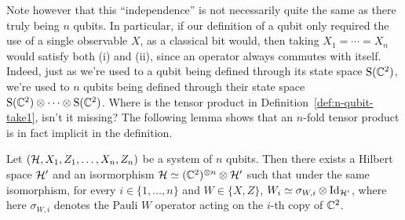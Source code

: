 Note however that this ``independence'' is not necessarily quite the same as there truly being $n$ qubits. In particular, if our definition of a qubit only required the use of a single observable $X$, as a classical bit would, then taking $X_1=\cdots=X_n$ would satisfy both (i) and (ii), since an operator always commutes with itself. Indeed, just as we're used to a qubit being defined through its state space $\mathrm{S}(\mathbb{C}^2)$, we're used to $n$ qubits being defined through their state space $\mathrm{S}(\mathbb{C}^2)\otimes \cdots \otimes \mathrm{S}(\mathbb{C}^2)$. Where is the tensor product in Definition~\ref{def:n-qubit-take1}, isn't it missing? The following lemma shows that an $n$-fold tensor product is in fact implicit in the definition. 

\begin{lemma}\label{lem:n-qubit-c2}
Let $(\mathcal{H},X_1,Z_1,\ldots,X_n,Z_n)$ be a system of $n$ qubits. Then there exists a Hilbert space $\mathcal{H}'$ and an isormorphism $\mathcal{H}\simeq (\mathbb{C}^2)^{\otimes n} \otimes \mathcal{H}'$ such that under the same isomorphism, for every $i\in \{1,\ldots, n\}$ and $W\in \{X,Z\}$, $W_i \simeq \sigma_{W,i} \otimes \mathop{\rm Id}\nolimits_{\mathcal{H}'}$, where here $\sigma_{W,i}$ denotes the Pauli $W$ operator acting on the $i$-th copy of $\mathbb{C}^2$. 
\end{lemma} 

